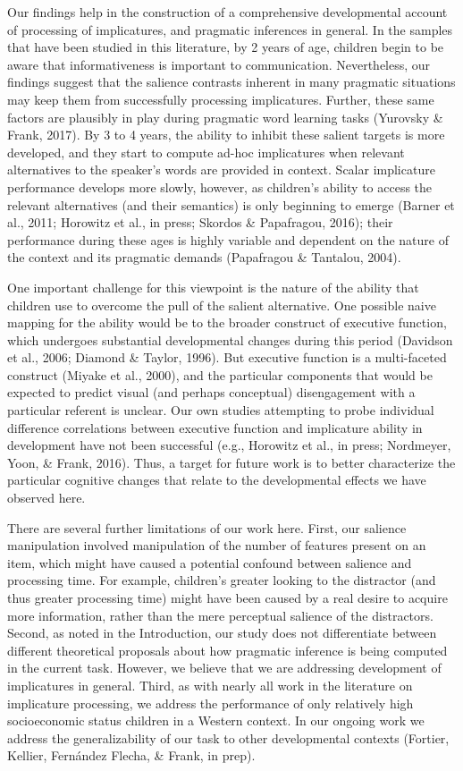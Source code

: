 \documentclass[man]{apa6}
\theoremstyle{definition}
\theoremstyle{definition}
\theoremstyle{definition}
\theoremstyle{remark}
\begin{document}
Our findings help in the construction of a comprehensive developmental
account of processing of implicatures, and pragmatic inferences in
general. In the samples that have been studied in this literature, by 2
years of age, children begin to be aware that informativeness is
important to communication. Nevertheless, our findings suggest that the
salience contrasts inherent in many pragmatic situations may keep them
from successfully processing implicatures. Further, these same factors
are plausibly in play during pragmatic word learning tasks (Yurovsky \&
Frank, 2017). By 3 to 4 years, the ability to inhibit these salient
targets is more developed, and they start to compute ad-hoc implicatures
when relevant alternatives to the speaker's words are provided in
context. Scalar implicature performance develops more slowly, however,
as children's ability to access the relevant alternatives (and their
semantics) is only beginning to emerge (Barner et al., 2011; Horowitz et
al., in press; Skordos \& Papafragou, 2016); their performance during
these ages is highly variable and dependent on the nature of the context
and its pragmatic demands (Papafragou \& Tantalou, 2004).

One important challenge for this viewpoint is the nature of the ability
that children use to overcome the pull of the salient alternative. One
possible naive mapping for the ability would be to the broader construct
of executive function, which undergoes substantial developmental changes
during this period (Davidson et al., 2006; Diamond \& Taylor, 1996). But
executive function is a multi-faceted construct (Miyake et al., 2000),
and the particular components that would be expected to predict visual
(and perhaps conceptual) disengagement with a particular referent is
unclear. Our own studies attempting to probe individual difference
correlations between executive function and implicature ability in
development have not been successful (e.g., Horowitz et al., in press;
Nordmeyer, Yoon, \& Frank, 2016). Thus, a target for future work is to
better characterize the particular cognitive changes that relate to the
developmental effects we have observed here.

There are several further limitations of our work here. First, our
salience manipulation involved manipulation of the number of features
present on an item, which might have caused a potential confound between
salience and processing time. For example, children's greater looking to
the distractor (and thus greater processing time) might have been caused
by a real desire to acquire more information, rather than the mere
perceptual salience of the distractors. Second, as noted in the
Introduction, our study does not differentiate between different
theoretical proposals about how pragmatic inference is being computed in
the current task. However, we believe that we are addressing development
of implicatures in general. Third, as with nearly all work in the
literature on implicature processing, we address the performance of only
relatively high socioeconomic status children in a Western context. In
our ongoing work we address the generalizability of our task to other
developmental contexts (Fortier, Kellier, Fernández Flecha, \& Frank, in
prep).
\end{document}
